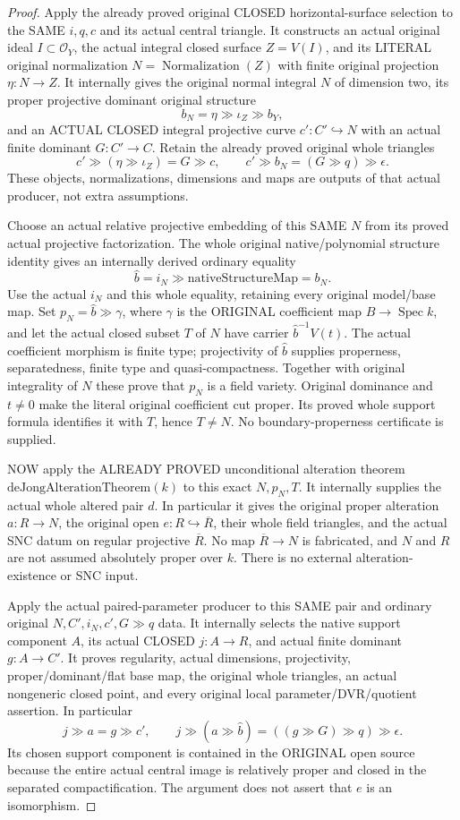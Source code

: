 \begin{proof}
Apply the already proved original CLOSED horizontal-surface selection
to the SAME $i,q,c$ and its actual central triangle. It constructs an
actual original ideal $I\subset\mathcal O_Y$, the actual integral
closed surface $Z=V(I)$, and its LITERAL original normalization
$N=\operatorname{Normalization}(Z)$ with finite original projection
$\eta:N\to Z$. It internally gives the original normal integral
$N$ of dimension two, its proper projective dominant original
structure
\[
 b_N=\eta\gg\iota_Z\gg b_Y,
\]
and an ACTUAL CLOSED integral projective curve
$c':C'\hookrightarrow N$ with an actual finite dominant
$G:C'\to C$. Retain the already proved original whole triangles
\[
 c'\gg(\eta\gg\iota_Z)=G\gg c,\qquad
 c'\gg b_N=(G\gg q)\gg\epsilon.
\]
These objects, normalizations, dimensions and maps are outputs of
that actual producer, not extra assumptions.

Choose an actual relative projective embedding of this SAME $N$
from its proved actual projective factorization. The whole original
native/polynomial structure identity gives an internally derived
ordinary equality
\[
 \widehat b=i_N\gg\mathrm{nativeStructureMap}=b_N.
\]
Use the actual $i_N$ and this whole equality, retaining every
original model/base map. Set
$p_N=\widehat b\gg\gamma$, where $\gamma$ is the ORIGINAL
coefficient map $B\to\operatorname{Spec}k$, and let the actual closed
subset $T$ of $N$ have carrier $\widehat b^{-1}V(t)$.
The actual coefficient morphism is finite type; projectivity of
$\widehat b$ supplies properness, separatedness, finite type and
quasi-compactness. Together with original integrality of $N$ these
prove that $p_N$ is a field variety. Original dominance and
$t\ne0$ make the literal original coefficient cut proper. Its
proved whole support formula identifies it with $T$, hence $T\ne N$.
No boundary-properness certificate is supplied.

NOW apply the ALREADY PROVED unconditional alteration theorem
$\mathrm{deJongAlterationTheorem}(k)$ to this exact $N,p_N,T$.
It internally supplies the actual whole altered pair $d$.
In particular it gives the original proper alteration
$a:R\to N$, the original open $e:R\hookrightarrow\overline R$,
their whole field triangles, and the actual SNC datum on regular
projective $\overline R$. No map $\overline R\to N$ is fabricated,
and $N$ and $R$ are not assumed absolutely proper over $k$.
There is no external alteration-existence or SNC input.

Apply the actual paired-parameter producer to this SAME pair and
ordinary original $N,C',i_N,c',G\gg q$ data. It internally selects
the native support component $A$, its actual CLOSED $j:A\to R$,
and actual finite dominant $g:A\to C'$. It proves regularity,
actual dimensions, projectivity, proper/dominant/flat base map,
the original whole triangles, an actual nongeneric closed point,
and every original local parameter/DVR/quotient assertion. In
particular
\[
 j\gg a=g\gg c',\qquad
 j\gg(a\gg\widehat b)=((g\gg G)\gg q)\gg\epsilon.
\]
Its chosen support component is contained in the ORIGINAL open
source because the entire actual central image is relatively
proper and closed in the separated compactification. The argument
does not assert that $e$ is an isomorphism.


\end{proof}
